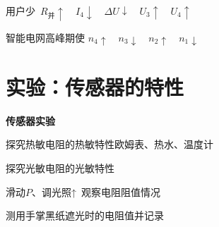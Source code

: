 \noindent 用户少\ $R_{\text{并}}\uparrow$\ \ $I_4\downarrow$\ \ $\Delta U\downarrow$\ \ $U_3\uparrow$\ \ $U_4\uparrow$%

\noindent 智能电网\quad 高峰期使 $n_4\uparrow$\ \ $n_3\downarrow$\ \ $n_2\uparrow$\ \ $n_1\downarrow$


\section{实验：传感器的特性}
\textbf{传感器实验}

探究热敏电阻的热敏特性\quad 欧姆表、热水、温度计


探究光敏电阻的光敏特性


滑动$P$、调光照↑\ 观察电阻阻值情况

测用手掌黑纸遮光时的电阻值并记录

